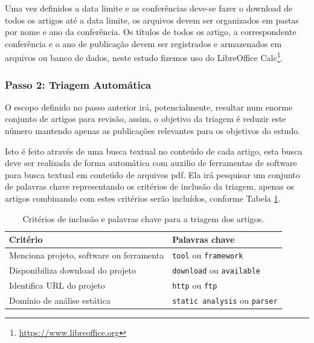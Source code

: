 
Uma vez definidos a data limite e as conferências deve-se fazer o download de
todos os artigos até a data limite, os arquivos devem ser organizados em pastas
por nome e ano da conferência. Os títulos de todos os artigo, a correspondente
conferência e o ano de publicação devem ser registrados e armazenados em
arquivos ou banco de dados, neste estudo fizemos uso do
LibreOffice Calc\footnote{\url{https://www.libreoffice.org}}.


\subsubsection{Passo 2: Triagem Automática} \label{estudo1:planejamento:filtro}

O escopo definido no passo anterior irá, potencialmente, resultar num enorme
conjunto de artigos para revisão, assim, o objetivo da triagem é reduzir este
número mantendo apenas as publicações relevantes para os objetivos do estudo.

Isto é feito através de uma busca textual no conteúdo de cada artigo, esta
busca deve ser realizada de forma automática com auxilio de ferramentas de
software para busca textual em conteúdo de arquivos pdf. Ela irá pesquisar um
conjunto de palavras chave representando os critérios de inclusão da triagem,
apenas os artigos combinando com estes critérios serão incluídos, conforme
Tabela \ref{criterios-triagem}.

\begin{table}[h]
\caption{Critérios de inclusão e palavras chave para a triagem dos artigos.}
\centering
\begin{tabular}{ l l }
  \hline
  Critério                                 & Palavras chave                        \\
  \hline
  Menciona projeto, software ou ferramenta & {\tt tool} ou {\tt framework}         \\
  Disponibiliza download do projeto        & {\tt download} ou {\tt available}     \\
  Identifica URL do projeto                & {\tt http} ou {\tt ftp}               \\
  Domínio de análise estática              & {\tt static analysis} ou {\tt parser} \\
  \hline
\end{tabular}
\label{criterios-triagem}
\end{table}

